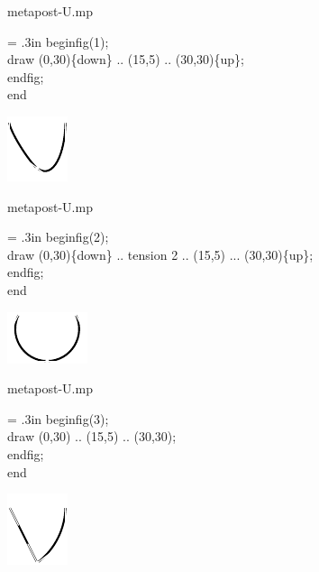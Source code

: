 \documentclass[danish,a2paper,22pt]{scrartcl}
\begin{document}
\begin{multicols*}{3}
\begin{spacing}{0.5}
\flushleft
\color{White}
\romansmall
metapost-U.mp\\
\vspace{.4cm}
\color{Black}
\typewritersmall
{\leftskip = .3in
beginfig(1);\\
draw (0,30)\fontsize{15pt}{40pt}\{down\} .. (15,5) .. (30,30)\fontsize{15pt}{40pt}\{up\};\\
endfig;\\
end
\par}
\vspace{1.5cm}

\center
\includegraphics[scale=5]{metapoints/metapoints-7.pdf}
\vspace{0.5cm}

\flushleft
\color{White}
\romansmall
metapost-U.mp\\
\vspace{.4cm}
\color{Black}
\typewritersmall
{\leftskip = .3in
beginfig(2);\\
draw (0,30)\fontsize{15pt}{40pt}\{down\} .. tension 2 .. (15,5) ... (30,30)\fontsize{15pt}{40pt}\{up\};\\
endfig;\\
end
\par}
\vspace{1.5cm}

\center
\includegraphics[scale=5]{metapoints/metapoints-8.pdf}
\vspace{1cm}

\flushleft
\color{White}
\romansmall
metapost-U.mp\\
\vspace{.4cm}
\color{Black}
\typewritersmall
{\leftskip = .3in
beginfig(3);\\
draw (0,30) .. (15,5) .. (30,30);\\
endfig;\\
end
\par}
\vspace{1.5cm}

\columnbreak

\center
\includegraphics[scale=5]{metapoints/metapoints-9.pdf}
\vspace{1.5cm}


\end{spacing}
\end{multicols*}
\end{document}
